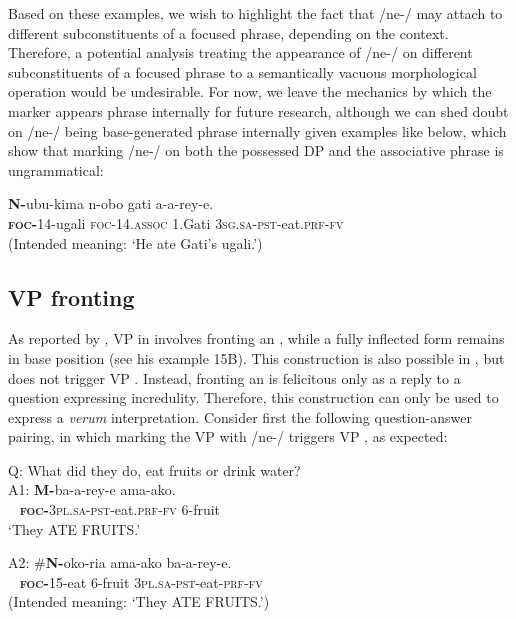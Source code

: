\documentclass[output=paper,modfonts]{langscibook}
\begin{document}
\largerpage
Based on these examples, we wish to highlight the fact that /ne-/ may attach to different subconstituents of a focused phrase, depending on the context. Therefore, a potential analysis treating the appearance of /ne-/ on different subconstituents of a focused phrase to a semantically vacuous morphological operation would be undesirable. For now, we leave the mechanics by which the  marker appears phrase internally for future research, although we can shed doubt on /ne-/ being base-generated phrase internally given examples like  below, which show that marking /ne-/ on both the possessed DP and the associative phrase is ungrammatical:

\ea\label{ex:landmann:40}
\gll *\textbf{N-}ubu-kima n-obo gati a-a-rey-e.\\
     \textsc{\textbf{foc-}}14-ugali \textsc{foc}-14.\textsc{assoc} 1.Gati \textsc{3sg}.\textsc{sa}-\textsc{pst}-eat.\textsc{prf}-\textsc{fv}\\
\glt (Intended meaning: ‘He ate Gati’s ugali.’)
\z


\subsection{VP fronting}\label{sec:landmann:5.2}



As reported by \citet{Schwarz2007}, VP  in  involves fronting an  , while a fully inflected form remains in base position (see his example 15B). This construction is also possible in , but does not trigger VP . Instead, fronting an   is felicitous only as a reply to a question expressing incredulity. Therefore, this construction can only be used to express a \textit{verum} interpretation. Consider first the following question-answer pairing, in which marking the VP with /ne-/ triggers VP , as expected:


\ea\label{ex:landmann:41}
 Q: What did they do, eat fruits or drink water?\\
\gll A1: \textbf{M-}ba-a-rey-e ama-ako.\\
    ~ \textsc{\textbf{foc-}}\textsc{3pl}.\textsc{sa}-\textsc{pst}-eat.\textsc{prf}-\textsc{fv} 6-fruit\\
\glt ‘They ATE FRUITS.’
\z

\ea\label{ex:landmann:42}
\gll A2: \#\textbf{N-}oko-ria ama-ako ba-a-rey-e.\\
    ~ \textsc{\textbf{foc-}}15-eat 6-fruit \textsc{3pl}.\textsc{sa}-\textsc{pst}-eat-\textsc{prf}-\textsc{fv}\\
\glt (Intended meaning: ‘They ATE FRUITS.’)
\z
\end{document}
